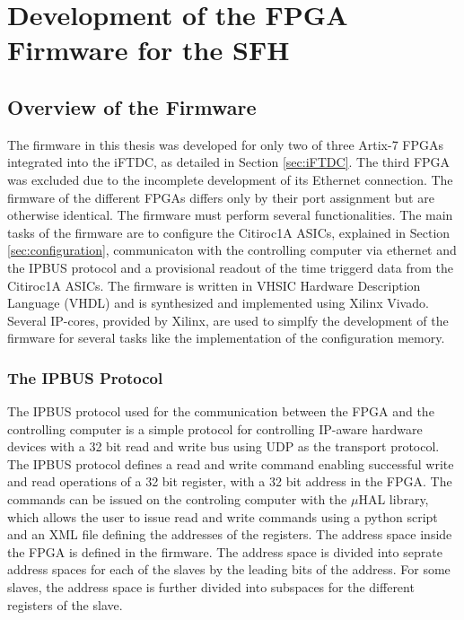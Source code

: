 \chapter{Development of the FPGA Firmware for the SFH}\label{cha:development}
\section{Overview of the Firmware}

The firmware in this thesis was developed for only two of three Artix-7 FPGAs integrated into the iFTDC, as detailed in Section \ref{sec:iFTDC}.
The third FPGA was excluded due to the incomplete development of its Ethernet connection.
\newline
The firmware of the different FPGAs differs only by their port assignment but are otherwise identical.
\newline
The firmware must perform several functionalities.
\newline
The main tasks of the firmware are to configure the Citiroc1A ASICs, explained in Section \ref{sec:configuration},
 communicaton with the controlling computer via ethernet and the IPBUS protocol and a provisional readout of the time triggerd data from the Citiroc1A ASICs.
\newline
The firmware is written in VHSIC Hardware Description Language (VHDL) and is synthesized and implemented using Xilinx Vivado.
Several IP-cores, provided by Xilinx, are used to simplfy the development of the firmware for several tasks like the implementation of the configuration memory.
\subsection{The IPBUS Protocol}
The IPBUS protocol used for the communication between the FPGA and the controlling computer is a simple protocol for controlling IP-aware hardware devices with a 32 bit read and write bus using UDP as the transport protocol.\autocite{IPBUS_article}
\newline
The IPBUS protocol defines a read and write command enabling successful write and read operations of a 32 bit register, with a 32 bit address in the FPGA.    
\newline
The commands can be issued on the controling computer with the $\mu$HAL library, which allows the user to issue read and write commands using a python script and an XML file defining the addresses of the registers.\autocite{IPBUS_article}
\newline
The address space inside the FPGA is defined in the firmware. The address space is divided into seprate address spaces for each of the slaves by the leading bits of the address.
For some slaves, the address space is further divided into subspaces for the different registers of the slave.


